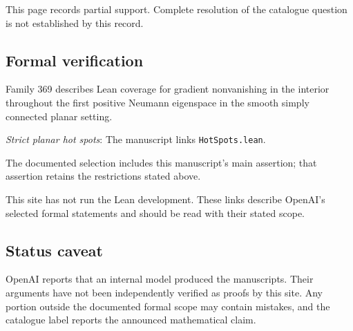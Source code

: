 \documentclass[11pt]{article}
\begin{document}
This page records partial support. Complete resolution of the catalogue question is not established by this record.

\subsection{Formal verification}
Family 369 describes Lean coverage for gradient nonvanishing in the interior throughout the first positive Neumann eigenspace in the smooth simply connected planar setting.

\textit{Strict planar hot spots}: The manuscript links \texttt{HotSpots.lean}.

The documented selection includes this manuscript’s main assertion; that assertion retains the restrictions stated above.

This site has not run the Lean development. These links describe OpenAI’s selected formal statements and should be read with their stated scope.

\subsection{Status caveat}
OpenAI reports that an internal model produced the manuscripts. Their arguments have not been independently verified as proofs by this site. Any portion outside the documented formal scope may contain mistakes, and the catalogue label reports the announced mathematical claim.
\end{document}
